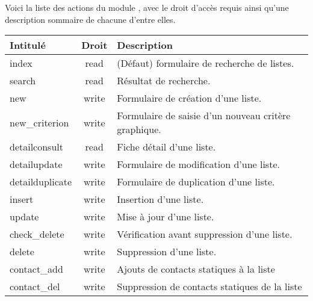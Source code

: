 Voici la liste des actions du module \List, avec le droit d'accès requis ainsi qu'une description sommaire de chacune d'entre elles.\\

\begin{tabular}{|l|c|p{9.5cm}|}
 \hline
 \textbf{Intitulé} & \textbf{Droit} & \textbf{Description} \\
 \hline
 \hline
  index & read & (Défaut) formulaire de recherche de listes. \\ 
 \hline
  search & read & Résultat de recherche. \\
 \hline
  new & write & Formulaire de création d'une liste. \\
 \hline
  new\_criterion & write & Formulaire de saisie d'un nouveau critère graphique. \\
 \hline
  detailconsult & read & Fiche détail d'une liste. \\
 \hline
  detailupdate & write & Formulaire de modification d'une liste. \\
 \hline
  detailduplicate & write & Formulaire de duplication d'une liste. \\
 \hline
  insert & write & Insertion d'une liste. \\
 \hline
  update & write & Mise à jour d'une liste. \\
 \hline
  check\_delete & write & Vérification avant suppression d'une liste. \\
 \hline
  delete & write & Suppression d'une liste. \\
 \hline
  contact\_add & write & Ajouts de contacts statiques à la liste\\
 \hline
  contact\_del & write & Suppression de contacts statiques de la liste\\
 \hline
\end{tabular}
